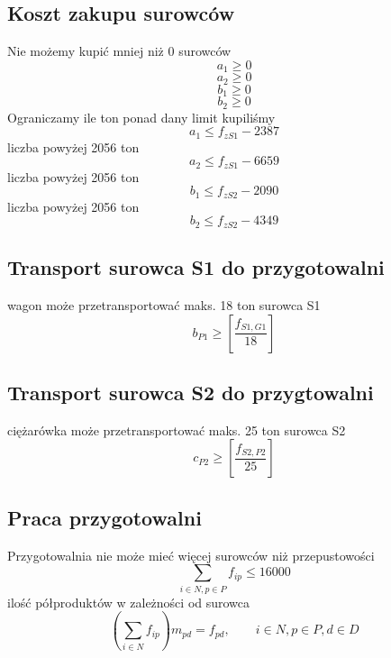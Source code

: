 \documentclass[12pt]{article}
\begin{document}
\subsection{Koszt zakupu surowców}
Nie możemy kupić mniej niż 0 surowców
\begin{equation}
a_1 \geq 0
\end{equation}
\begin{equation}
a_2 \geq 0
\end{equation}
\begin{equation}
b_1 \geq 0
\end{equation}
\begin{equation}
b_2 \geq 0
\end{equation}
Ograniczamy ile ton ponad dany limit kupiliśmy
\begin{equation}
a_1 \leq f_{zS1} - 2387
\end{equation}
liczba powyżej 2056 ton
\begin{equation}
a_2 \leq f_{zS1} - 6659
\end{equation}
liczba powyżej 2056 ton
\begin{equation}
b_1 \leq f_{zS2} - 2090
\end{equation}
liczba powyżej 2056 ton
\begin{equation}
b_2 \leq f_{zS2} - 4349
\end{equation}
\subsection{Transport surowca S1 do przygotowalni}
wagon może przetransportować maks. 18 ton surowca S1
\begin{equation}
b_{P1} \geq [\frac{ f_{S1, G1} }{18}]
\end{equation}
\subsection{Transport surowca S2 do przygtowalni}
ciężarówka może przetransportować maks. 25 ton surowca S2
\begin{equation}
c_{P2} \geq [ \frac{ f_{S2, P2} }{ 25 } ]
\end{equation}
\subsection{Praca przygotowalni}
Przygotowalnia nie może mieć więcej surowców niż przepustowości
\begin{equation}
\sum_{i \in N, p \in P} f_{ip} \leq 16000
\end{equation}
ilość półproduktów w zależności od surowca
\begin{equation}
(\sum_{i \in N} f_{ip}) m_{pd} = f_{pd}, \qquad i \in N, p \in P, d \in D
\end{equation}
\end{document}
